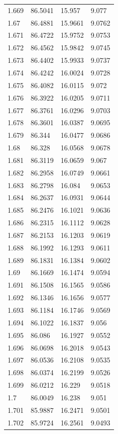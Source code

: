 \begin{tabular}{llll}
1.669 & 86.5041 & 15.957 & 9.077 \\
1.67 & 86.4881 & 15.9661 & 9.0762 \\
1.671 & 86.4722 & 15.9752 & 9.0753 \\
1.672 & 86.4562 & 15.9842 & 9.0745 \\
1.673 & 86.4402 & 15.9933 & 9.0737 \\
1.674 & 86.4242 & 16.0024 & 9.0728 \\
1.675 & 86.4082 & 16.0115 & 9.072 \\
1.676 & 86.3922 & 16.0205 & 9.0711 \\
1.677 & 86.3761 & 16.0296 & 9.0703 \\
1.678 & 86.3601 & 16.0387 & 9.0695 \\
1.679 & 86.344 & 16.0477 & 9.0686 \\
1.68 & 86.328 & 16.0568 & 9.0678 \\
1.681 & 86.3119 & 16.0659 & 9.067 \\
1.682 & 86.2958 & 16.0749 & 9.0661 \\
1.683 & 86.2798 & 16.084 & 9.0653 \\
1.684 & 86.2637 & 16.0931 & 9.0644 \\
1.685 & 86.2476 & 16.1021 & 9.0636 \\
1.686 & 86.2315 & 16.1112 & 9.0628 \\
1.687 & 86.2153 & 16.1203 & 9.0619 \\
1.688 & 86.1992 & 16.1293 & 9.0611 \\
1.689 & 86.1831 & 16.1384 & 9.0602 \\
1.69 & 86.1669 & 16.1474 & 9.0594 \\
1.691 & 86.1508 & 16.1565 & 9.0586 \\
1.692 & 86.1346 & 16.1656 & 9.0577 \\
1.693 & 86.1184 & 16.1746 & 9.0569 \\
1.694 & 86.1022 & 16.1837 & 9.056 \\
1.695 & 86.086 & 16.1927 & 9.0552 \\
1.696 & 86.0698 & 16.2018 & 9.0543 \\
1.697 & 86.0536 & 16.2108 & 9.0535 \\
1.698 & 86.0374 & 16.2199 & 9.0526 \\
1.699 & 86.0212 & 16.229 & 9.0518 \\
1.7 & 86.0049 & 16.238 & 9.051 \\
1.701 & 85.9887 & 16.2471 & 9.0501 \\
1.702 & 85.9724 & 16.2561 & 9.0493 \\

\end{tabular}
